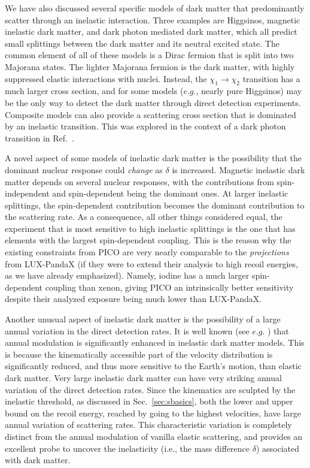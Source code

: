 \documentclass[11pt]{article}
\begin{document}
We have also discussed several specific models of dark matter that predominantly scatter through an inelastic interaction. Three examples are Higgsinos, magnetic inelastic dark matter, and dark photon mediated dark matter, which all predict small splittings between the dark matter and its neutral excited state.  The common element of all of these models is a Dirac fermion that is split into two Majorana states.  The lighter Majorana fermion is the dark matter, with highly suppressed elastic interactions with nuclei.  Instead, the $\chi_1 \rightarrow \chi_2$ transition has a much larger cross section, and for some models ($e.g.$, nearly pure Higgsinos) may be the only way to detect the dark matter through direct detection experiments.  Composite models can also provide a scattering cross section that is dominated by an inelastic transition.  This was explored in the context of a dark photon transition in Ref.~\cite{Alves:2009nf,Lisanti:2009am}.

A novel aspect of some models of inelastic dark matter
is the possibility that the dominant nuclear response could
\emph{change} as $\delta$ is increased.  Magnetic inelastic dark matter
depends on several nuclear responses, with the contributions from
spin-independent and spin-dependent being the dominant ones.
At larger inelastic splittings, the spin-dependent contribution
becomes the dominant contribution to the scattering rate.  
As a consequence, all other things considered equal, the experiment 
that is most sensitive to high inelastic splittings is the one 
that has elements with the largest spin-dependent coupling.  
This is the reason why the existing constraints from PICO
are very nearly comparable to the \emph{projections} from LUX-PandaX
(if they were to extend their analysis to high recoil energies, 
as we have already emphasized).  Namely, iodine has a much
larger spin-dependent coupling than xenon, giving PICO an
intrinsically better sensitivity despite their analyzed 
exposure being much lower than LUX-PandaX. 

Another unusual aspect of inelastic dark matter is the 
possibility of a large annual variation in the direct
detection rates.  It is well known (see $e.g.$
\cite{TuckerSmith:2001hy,TuckerSmith:2004jv,Chang:2008gd})
that annual modulation is significantly enhanced
in inelastic dark matter models.  This is because 
the kinematically accessible part of the velocity distribution 
is significantly reduced, and thus more sensitive to the Earth's motion, 
than elastic dark matter.  Very large inelastic dark matter
can have very striking annual variation of the direct
detection rates.  Since the kinematics are sculpted by the
inelastic threshold, as discussed in Sec.~\ref{sec:sbasics},
both the lower and upper bound on the recoil energy, 
reached by going to the highest velocities, have large 
annual variation of scattering rates.  This characteristic 
variation is completely distinct from the annual modulation 
of vanilla elastic scattering, and provides an 
excellent probe to uncover the inelasticity 
(i.e., the mass difference $\delta$) 
associated with dark matter.  
\end{document}
